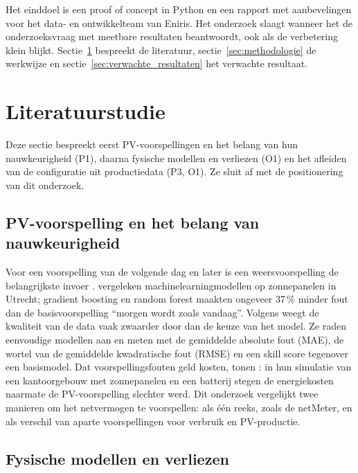 Het einddoel is een proof of concept in Python en een rapport met aanbevelingen voor het data- en ontwikkelteam van Eniris. Het onderzoek slaagt wanneer het de onderzoeksvraag met meetbare resultaten beantwoordt, ook als de verbetering klein blijkt. Sectie~\ref{sec:literatuurstudie} bespreekt de literatuur, sectie~\ref{sec:methodologie} de werkwijze en sectie~\ref{sec:verwachte_resultaten} het verwachte resultaat.


\section{Literatuurstudie}%
\label{sec:literatuurstudie}

Deze sectie bespreekt eerst PV-voorspellingen en het belang van hun nauwkeurigheid (P1), daarna fysische modellen en verliezen (O1) en het afleiden van de configuratie uit productiedata (P3, O1). Ze sluit af met de positionering van dit onderzoek.

\subsection{PV-voorspelling en het belang van nauwkeurigheid}

Voor een voorspelling van de volgende dag en later is een weersvoorspelling de belangrijkste invoer \autocite{Pandzic2024}. \textcite{Gaboitaolelwe2023} vergeleken machinelearningmodellen op zonnepanelen in Utrecht; gradient boosting en random forest maakten ongeveer 37\,\% minder fout dan de basisvoorspelling ``morgen wordt zoals vandaag''. Volgens \textcite{Pandzic2024} weegt de kwaliteit van de data vaak zwaarder door dan de keuze van het model. Ze raden eenvoudige modellen aan en meten met de gemiddelde absolute fout (MAE), de wortel van de gemiddelde kwadratische fout (RMSE) en een skill score tegenover een basismodel. Dat voorspellingsfouten geld kosten, tonen \textcite{Schmitt2021}: in hun simulatie van een kantoorgebouw met zonnepanelen en een batterij stegen de energiekosten naarmate de PV-voorspelling slechter werd. Dit onderzoek vergelijkt twee manieren om het netvermogen te voorspellen: als één reeks, zoals de netMeter, en als verschil van aparte voorspellingen voor verbruik en PV-productie.

\subsection{Fysische modellen en verliezen}

